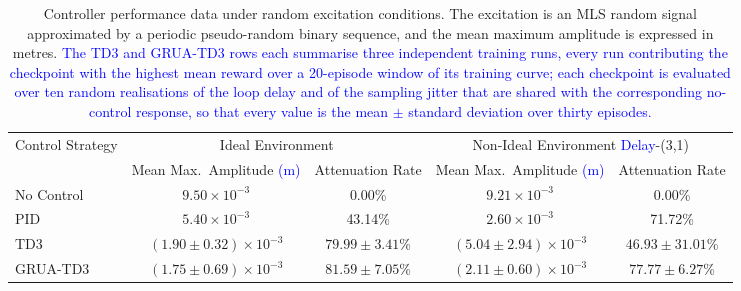 \begin{table}[htbp]
\centering
\caption{Controller performance data under random excitation conditions. The excitation is an MLS random signal approximated by a periodic pseudo-random binary sequence, and the mean maximum amplitude is expressed in metres. \textcolor{blue}{The TD3 and GRUA-TD3 rows each summarise three independent training runs, every run contributing the checkpoint with the highest mean reward over a 20-episode window of its training curve; each checkpoint is evaluated over ten random realisations of the loop delay and of the sampling jitter that are shared with the corresponding no-control response, so that every value is the mean $\pm$ standard deviation over thirty episodes.}}
\label{tab:random_data}
\footnotesize
\setlength{\tabcolsep}{3.5pt}
\begin{tabular}{lcccc}
\toprule
\multirow{2}{*}{Control Strategy} & \multicolumn{2}{c}{Ideal Environment} & \multicolumn{2}{c}{Non-Ideal Environment \textcolor{blue}{Delay}-(3,1)} \\
\cline{2-5}
& Mean Max.\ Amplitude \textcolor{blue}{(m)} & Attenuation Rate & Mean Max.\ Amplitude \textcolor{blue}{(m)} & Attenuation Rate \\ \midrule
No Control & $9.50\times10^{-3}$ & 0.00\% & $9.21\times10^{-3}$ & 0.00\% \\
PID & $5.40\times10^{-3}$ & 43.14\% & $2.60\times10^{-3}$ & 71.72\% \\
TD3 & $(1.90\pm0.32)\times10^{-3}$ & $79.99\pm3.41$\% & $(5.04\pm2.94)\times10^{-3}$ & $46.93\pm31.01$\% \\
GRUA-TD3 & $(1.75\pm0.69)\times10^{-3}$ & $81.59\pm7.05$\% & $(2.11\pm0.60)\times10^{-3}$ & $77.77\pm6.27$\% \\
\bottomrule
\end{tabular}
\end{table}

